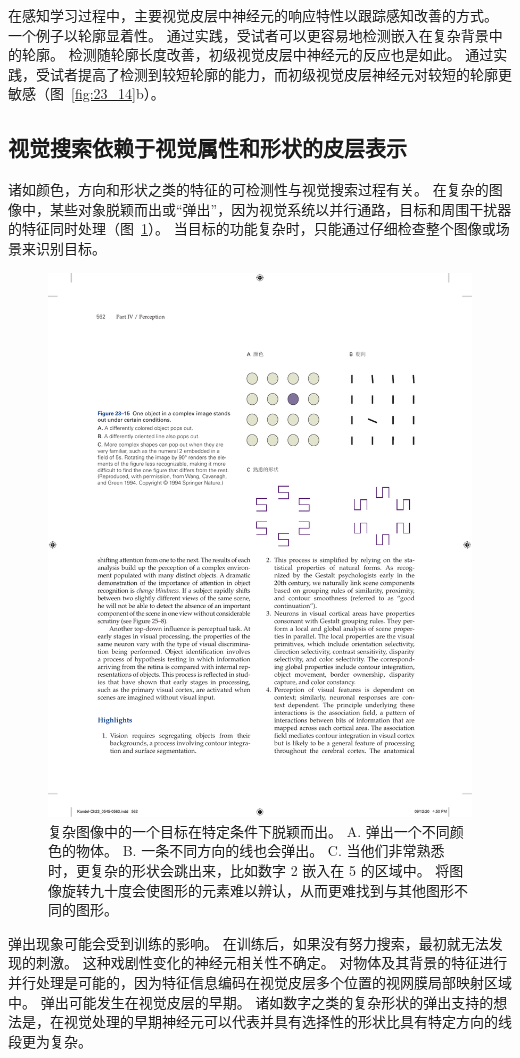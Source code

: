 在感知学习过程中，主要视觉皮层中神经元的响应特性以跟踪感知改善的方式。
一个例子以轮廓显着性。
通过实践，受试者可以更容易地检测嵌入在复杂背景中的轮廓。
检测随轮廓长度改善，初级视觉皮层中神经元的反应也是如此。
通过实践，受试者提高了检测到较短轮廓的能力，而初级视觉皮层神经元对较短的轮廓更敏感（图~\ref{fig:23_14}b）。



\subsection{视觉搜索依赖于视觉属性和形状的皮层表示}

诸如颜色，方向和形状之类的特征的可检测性与视觉搜索过程有关。
在复杂的图像中，某些对象脱颖而出或“弹出”，因为视觉系统以并行通路，目标和周围干扰器的特征同时处理（图~\ref{fig:23_15}）。
当目标的功能复杂时，只能通过仔细检查整个图像或场景来识别目标。


\begin{figure}[htbp]
	\centering
	\includegraphics[width=0.6\linewidth]{chap23/fig_23_15}
	\caption{复杂图像中的一个目标在特定条件下脱颖而出。
		A. 弹出一个不同颜色的物体。
		B. 一条不同方向的线也会弹出。
		C. 当他们非常熟悉时，更复杂的形状会跳出来，比如数字 2 嵌入在 5 的区域中。
		将图像旋转九十度会使图形的元素难以辨认，从而更难找到与其他图形不同的图形\cite{wang1994familiarity}。}
	\label{fig:23_15}
\end{figure}


弹出现象可能会受到训练的影响。
在训练后，如果没有努力搜索，最初就无法发现的刺激。 
这种戏剧性变化的神经元相关性不确定。
对物体及其背景的特征进行并行处理是可能的，因为特征信息编码在视觉皮层多个位置的视网膜局部映射区域中。
弹出可能发生在视觉皮层的早期。
诸如数字之类的复杂形状的弹出支持的想法是，在视觉处理的早期神经元可以代表并具有选择性的形状比具有特定方向的线段更为复杂。




